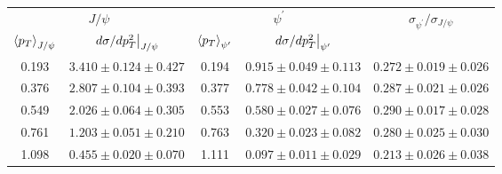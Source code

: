 \begin{tabular}{cc|cc|c}
\hline
\multicolumn{2}{c|}{$J/\psi$} &
  \multicolumn{2}{c|}{$\psi^{\prime}$} &
  \multirow{2}{*}{$\sigma_{\psi^\prime}/\sigma_{J/\psi}$} \\ \cline{1-4}
$\expval{p_T}_{J/\psi}$ &
  $\eval{d\sigma/dp_T^2}_{J/\psi}$ &
  $\expval{p_T}_{\psi^\prime}$ &
  $\eval{d\sigma/dp_T^2}_{\psi^\prime}$ &
   \\ \hline
\multicolumn{1}{c|}{0.193} &
  $3.410\pm0.124\pm0.427$ &
  \multicolumn{1}{c|}{0.194} &
  $0.915\pm0.049\pm0.113$ &
  $0.272\pm0.019\pm0.026$ \\
\multicolumn{1}{c|}{0.376} &
  $2.807\pm0.104\pm0.393$ &
  \multicolumn{1}{c|}{0.377} &
  $0.778\pm0.042\pm0.104$ &
  $0.287\pm0.021\pm0.026$ \\
\multicolumn{1}{c|}{0.549} &
  $2.026\pm0.064\pm0.305$ &
  \multicolumn{1}{c|}{0.553} &
  $0.580\pm0.027\pm0.076$ &
  $0.290\pm0.017\pm0.028$ \\
\multicolumn{1}{c|}{0.761} &
  $1.203\pm0.051\pm0.210$ &
  \multicolumn{1}{c|}{0.763} &
  $0.320\pm0.023\pm0.082$ &
  $0.280\pm0.025\pm0.030$ \\
\multicolumn{1}{c|}{1.098} &
  $0.455\pm0.020\pm0.070$ &
  \multicolumn{1}{c|}{1.111} &
  $0.097\pm0.011\pm0.029$ &
  $0.213\pm0.026\pm0.038$ \\ \hline
\end{tabular}
